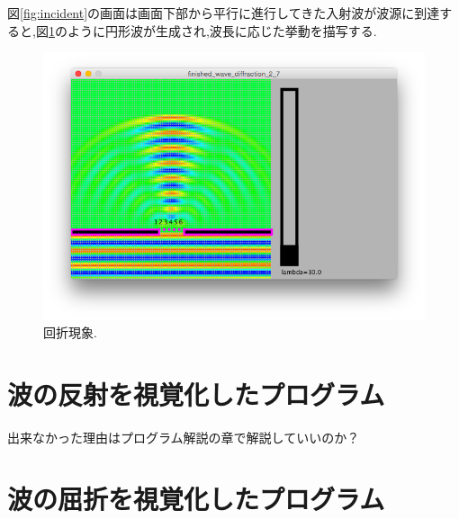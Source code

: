 図\ref{fig:incident}の画面は画面下部から平行に進行してきた入射波が波源に到達すると,図\ref{fig:elementary}のように円形波が生成され,波長に応じた挙動を描写する.


\begin{figure}[htbp]
 \begin{center}
  \includegraphics[width=130mm]{../result/diffractionelementary.png}
 \end{center}
 \caption{回折現象.}
 \label{fig:elementary}
\end{figure}





\section{波の反射を視覚化したプログラム}
出来なかった理由はプログラム解説の章で解説していいのか？


\section{波の屈折を視覚化したプログラム}



















